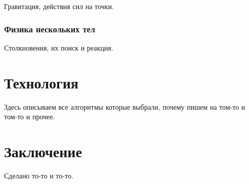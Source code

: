 \documentclass[a4paper,12pt]{report}
\begin{document}
Гравитация, действия сил на точки.

\subsubsection{Физика нескольких тел}

Столкновения, их поиск и реакция.

\section{Технология}

Здесь описываем все алгоритмы которые выбрали, почему пишем на том-то и том-то и прочее.


\section{Заключение}

Сделано то-то и то-то.
\end{document}
